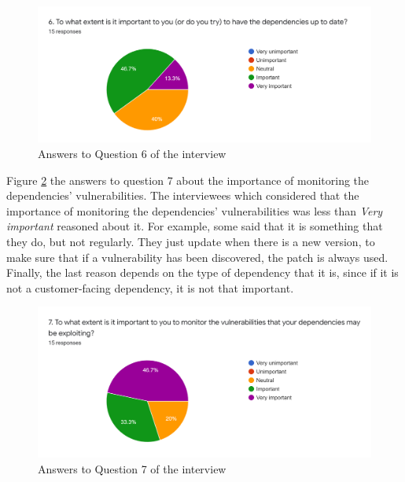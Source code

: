 \begin{figure}[ht!]
\begin{center}
\includegraphics[width=\textwidth]{figures/interview/Question6.png}
\caption{Answers to Question 6 of the interview}
\label{fig:interview-6}
\end{center}
\end{figure}

 Figure \ref{fig:interview-7} the answers to question 7 about the importance of monitoring the dependencies' vulnerabilities. The interviewees which considered that the importance of monitoring the dependencies' vulnerabilities was less than \textit{Very important} reasoned about it. For example, some said that it is something that they do, but not regularly. They just update when there is a new version, to make sure that if a vulnerability has been discovered, the patch is always used. Finally, the last reason depends on the type of dependency that it is, since if it is not a customer-facing dependency, it is not that important.

\begin{figure}[ht!]
\begin{center}
\includegraphics[width=\textwidth]{figures/interview/Question7.png}
\caption{Answers to Question 7 of the interview}
\label{fig:interview-7}
\end{center}
\end{figure}

